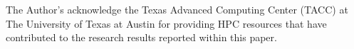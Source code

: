 \documentclass[sigconf]{acmart}
\begin{document}
%





\maketitle









\begin{acks}
The Author's acknowledge the Texas Advanced Computing Center (TACC) at The
University of Texas at Austin for providing HPC resources that have
contributed to the research results reported within this paper.
\end{acks}


 
\end{document}
